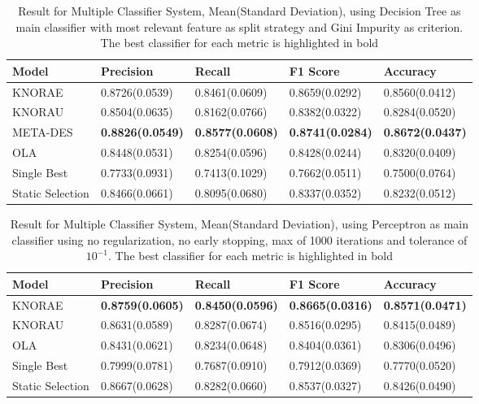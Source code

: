 \begin{table}[h!]
    \centering
    \renewcommand{\arraystretch}{1.8}
    \begin{tabular}{ |p{3cm}|p{2.6cm}p{2.6cm}p{2.6cm}p{2.6cm}| }
        \hline
        Model & Precision & Recall & F1 Score & Accuracy \\
        \hline
        KNORAE & 0.8726(0.0539) & 0.8461(0.0609) & 0.8659(0.0292) & 0.8560(0.0412) \\
        KNORAU & 0.8504(0.0635) & 0.8162(0.0766) & 0.8382(0.0322) & 0.8284(0.0520) \\
        META-DES & \textbf{0.8826(0.0549)} & \textbf{0.8577(0.0608)} & \textbf{0.8741(0.0284)} & \textbf{0.8672(0.0437)} \\
        OLA & 0.8448(0.0531) & 0.8254(0.0596) & 0.8428(0.0244) & 0.8320(0.0409) \\
        Single Best & 0.7733(0.0931) & 0.7413(0.1029) & 0.7662(0.0511) & 0.7500(0.0764) \\
        Static Selection & 0.8466(0.0661) & 0.8095(0.0680) & 0.8337(0.0352) & 0.8232(0.0512) \\ [1ex]
        \hline
        \end{tabular}
        \caption{%
        Result for Multiple Classifier System, Mean(Standard Deviation), using Decision Tree as main classifier with most relevant feature as split strategy and Gini Impurity as criterion. The best classifier for each metric is highlighted in bold%
        }\label{mcs_dt_table}
\end{table}

\begin{table}[h!]
    \centering
    \renewcommand{\arraystretch}{1.8}
    \begin{tabular}{ |p{3cm}|p{2.6cm}p{2.6cm}p{2.6cm}p{2.6cm}| }
        \hline
        Model & Precision & Recall & F1 Score & Accuracy \\
        \hline
        KNORAE & \textbf{0.8759(0.0605)} & \textbf{0.8450(0.0596)} & \textbf{0.8665(0.0316)} & \textbf{0.8571(0.0471)} \\
        KNORAU & 0.8631(0.0589) & 0.8287(0.0674) & 0.8516(0.0295) & 0.8415(0.0489) \\
        OLA & 0.8431(0.0621) & 0.8234(0.0648) & 0.8404(0.0361) & 0.8306(0.0496) \\
        Single Best & 0.7999(0.0781) & 0.7687(0.0910) & 0.7912(0.0369) & 0.7770(0.0520) \\
        Static Selection & 0.8667(0.0628) & 0.8282(0.0660) & 0.8537(0.0327) & 0.8426(0.0490) \\ [1ex]
        \hline
        \end{tabular}
        \caption{%
        Result for Multiple Classifier System, Mean(Standard Deviation), using Perceptron as main classifier using no regularization, no early stopping, max of 1000 iterations and tolerance of $10^{-1}$. The best classifier for each metric is highlighted in bold%
        }\label{mcs_perceptron_table}
\end{table}
